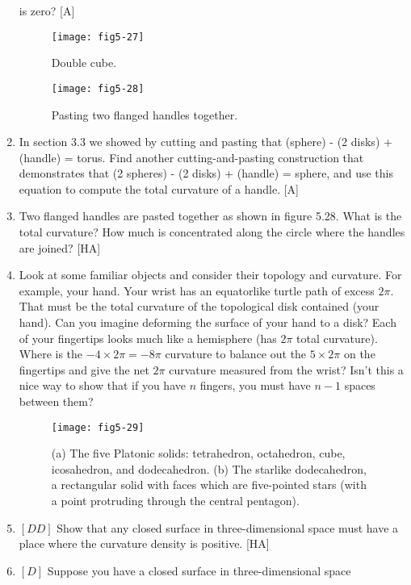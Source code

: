 \documentclass{book}
\begin{document}
\begin{enumerate}
is zero? [A]
\begin{figure}
\begin{center}
\texttt{[image: fig5-27]}
\caption{Double cube.}
\end{center}
\end{figure}
\begin{figure}
\begin{center}
\texttt{[image: fig5-28]}
\caption{Pasting two flanged handles together.}
\end{center}
\end{figure}
\item In section 3.3 we showed by cutting and pasting that
(sphere) - (2 disks) + (handle) = torus. Find another cutting-and-pasting construction that demonstrates that
(2 spheres) - (2 disks) + (handle) = sphere,
and use this equation to compute the total curvature of a handle. [A]
\item Two flanged handles are pasted together as shown in figure 5.28.
What is the total curvature? How much is concentrated along the circle
where the handles are joined? [HA]
\item Look at some familiar objects and consider their topology and
curvature. For example, your hand. Your wrist has an equatorlike turtle
path of excess $2 \pi$. That must be the total curvature of the topological
disk contained (your hand). Can you imagine deforming the surface
of your hand to a disk? Each of your fingertips looks much like a
hemisphere (has $2 \pi$ total curvature). Where is the $-4 \times 2 \pi = -8 \pi$
curvature to balance out the $5 \times 2 \pi$ on the fingertips and give the net
$2 \pi $ curvature measured from the wrist? Isn't this a nice way to show
that if you have $n$ fingers, you must have $n - 1$ spaces between them?
\begin{figure}
\begin{center}
\texttt{[image: fig5-29]}
\caption{(a) The five Platonic solids: tetrahedron, octahedron, cube, icosahedron, and dodecahedron. (b) The starlike dodecahedron, a rectangular solid with faces which are five-pointed stars (with a point protruding through the central pentagon).}
\end{center}
\end{figure}
\item $[DD]$ Show that any closed surface in three-dimensional space must
have a place where the curvature density is positive. [HA]
\item $[D]$ Suppose you have a closed surface in three-dimensional space

\end{enumerate}
\end{document}
